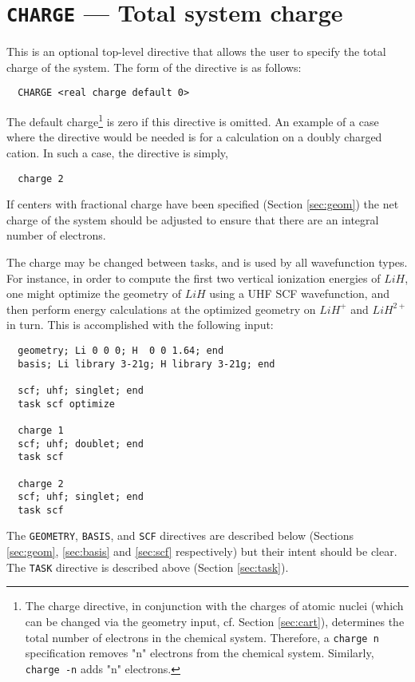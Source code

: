 \section{{\tt CHARGE} --- Total system charge}
\label{sec:charge}

This is an optional top-level directive that allows the user to specify
the total charge of the system.  The form of the directive is as follows:
\begin{verbatim}
  CHARGE <real charge default 0>
\end{verbatim}

The default charge\footnote{The charge directive, in conjunction with
  the charges of atomic nuclei (which can be changed via the geometry
  input, cf. Section \ref{sec:cart}), determines the total number of
  electrons in the chemical system.  Therefore, a \verb+charge n+
  specification removes "n" electrons from the chemical system.
  Similarly, \verb+charge -n+ adds "n" electrons.} is zero
if this directive is omitted.  An example of a case where the
directive would be needed is for a calculation on a doubly charged
cation.  In such a case, the directive is simply,
\begin{verbatim}
  charge 2
\end{verbatim}

If centers with fractional charge have been specified (Section
\ref{sec:geom}) the net charge of the system should be adjusted to
ensure that there are an integral number of electrons.

The charge may be changed between tasks, and is used by all
wavefunction types.  For instance, in order to compute the first two
vertical ionization energies of $LiH$, one might optimize the geometry
of $LiH$ using a UHF SCF wavefunction, and then perform energy
calculations at the optimized geometry on $LiH^+$ and
$LiH^{2+}$ in turn.  This is accomplished with the following input:
\begin{verbatim}
  geometry; Li 0 0 0; H  0 0 1.64; end
  basis; Li library 3-21g; H library 3-21g; end

  scf; uhf; singlet; end
  task scf optimize

  charge 1
  scf; uhf; doublet; end
  task scf

  charge 2
  scf; uhf; singlet; end
  task scf
\end{verbatim}
The \verb+GEOMETRY+, \verb+BASIS+, and \verb+SCF+ directives are
described below (Sections \ref{sec:geom}, \ref{sec:basis} and
\ref{sec:scf} respectively) but their intent should be clear.  The
\verb+TASK+ directive is described above (Section \ref{sec:task}).  


